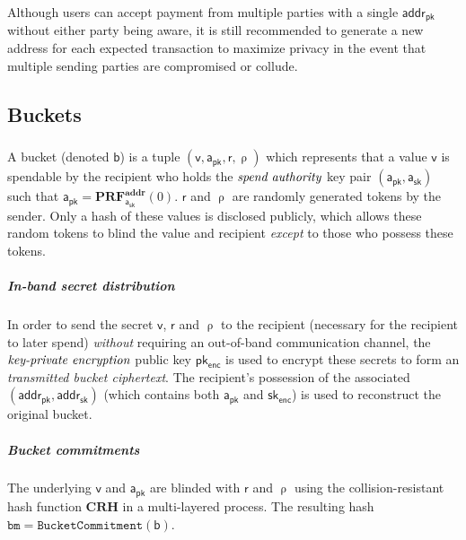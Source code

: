\documentclass[8pt]{article}
\newcommand{\PublicAddress}{\mathsf{addr_{pk}}}
\newcommand{\PrivateAddress}{\mathsf{addr_{sk}}}
\newcommand{\SpendAuthorityPublic}{\mathsf{a_{pk}}}
\newcommand{\SpendAuthorityPrivate}{\mathsf{a_{sk}}}
\newcommand{\SpendAuthorityName}{\emph{spend authority}}
\newcommand{\TransmitPublic}{\mathsf{pk_{enc}}}
\newcommand{\TransmitPrivate}{\mathsf{sk_{enc}}}
\newcommand{\TransmitPublicName}{\emph{key-private encryption}}
\newcommand{\Value}{\mathsf{v}}
\newcommand{\Bucket}{\mathsf{b}}
\newcommand{\BucketRand}{\mathsf{r}}
\newcommand{\BucketAddressRand}{\mathsf{\uprho}}
\newcommand{\BucketCiphertextName}{\emph{transmitted bucket ciphertext}}
\newcommand{\CRH}{\mathbf{CRH}}
\newcommand{\PRF}[2]{\mathbf{PRF_{#1}^{#2}}}
\newcommand{\PRFaddr}[1]{\PRF{#1}{addr}}
\newcommand{\bm}{\mathbf{\mathtt{bm}}}
\newcommand{\BucketCommitment}[1]{\mathtt{BucketCommitment(#1)}}
\begin{document}
Although users can accept payment from multiple parties with a single $\PublicAddress$ without either party being aware, it is still recommended to generate a new address for each expected transaction to maximize privacy in the event that multiple sending parties are compromised or collude.

\subsection{Buckets}

\subparagraph{}

A bucket (denoted $\Bucket$) is a tuple $(\Value, \SpendAuthorityPublic, \BucketRand, \BucketAddressRand)$ which represents that a value $\Value$ is spendable by the recipient who holds the $\SpendAuthorityName$ key pair $(\SpendAuthorityPublic, \SpendAuthorityPrivate)$ such that $\SpendAuthorityPublic=\PRFaddr{\SpendAuthorityPrivate}(0)$. $\BucketRand$ and $\BucketAddressRand$ are randomly generated tokens by the sender. Only a hash of these values is disclosed publicly, which allows these random tokens to blind the value and recipient \textit{except} to those who possess these tokens.

\subparagraph{In-band secret distribution}

In order to send the secret $\Value$, $\BucketRand$ and $\BucketAddressRand$ to the recipient (necessary for the recipient to later spend) \textit{without} requiring an out-of-band communication channel, the $\TransmitPublicName$ public key $\TransmitPublic$ is used to encrypt these secrets to form an \BucketCiphertextName. The recipient's possession of the associated $(\PublicAddress, \PrivateAddress)$ (which contains both $\SpendAuthorityPublic$ and $\TransmitPrivate$) is used to reconstruct the original bucket.

\subparagraph{Bucket commitments}

The underlying $\Value$ and $\SpendAuthorityPublic$ are blinded with $\BucketRand$ and $\BucketAddressRand$ using the collision-resistant hash function $\CRH$ in a multi-layered process. The resulting hash $\bm = \BucketCommitment{\Bucket}$.
\end{document}
